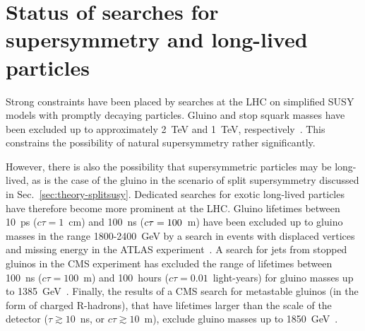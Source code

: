 \section{Status of searches for supersymmetry and long-lived particles}
\label{sec:theory-status}
Strong constraints have been placed by searches at the LHC on simplified SUSY 
models with promptly decaying particles. Gluino and stop squark masses have 
been excluded up to approximately 2~TeV and 1~TeV, 
respectively~\cite{mt236,ra2b36,stop0L36,stop1L36,stop2L36}. 
This constrains the possibility of natural supersymmetry rather significantly.

However, there is also the possibility that supersymmetric particles may be 
long-lived, as is the case of the gluino in the scenario of split supersymmetry 
discussed in Sec.~\ref{sec:theory-splitsusy}. Dedicated searches for exotic 
long-lived particles have therefore become more prominent at the LHC. Gluino 
lifetimes between 10~ps ($c\tau=1$~cm) and 100~ns ($c\tau=100$~m) have been 
excluded up to gluino masses in the range 1800-2400~GeV by a search in events 
with displaced vertices and missing energy in the ATLAS 
experiment~\cite{dispvert-atlas}. A search for jets from stopped gluinos in the 
CMS experiment has excluded the range of lifetimes between 100~ns 
($c\tau=100$~m) and 100~hours ($c\tau=0.01$~light-years) for gluino masses up 
to 
1385~GeV~\cite{stoppedgluino-cms}. Finally, the results of a CMS search for 
metastable gluinos (in the form of charged R-hadrons), that have lifetimes 
larger than the scale of the detector ($\tau \gtrsim 10$~ns, or $c\tau \gtrsim 
10$~m), exclude gluino masses up to 1850~GeV~\cite{hscp-cms}.

